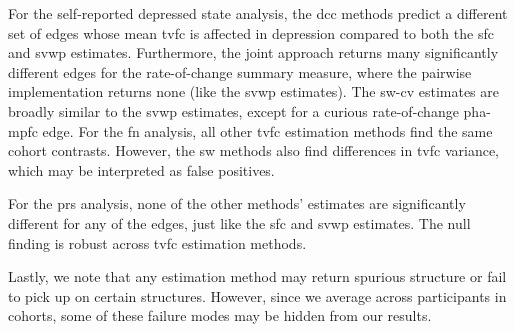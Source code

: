 For the self-reported depressed state analysis, the \gls{dcc} methods predict a different set of edges whose mean \gls{tvfc} is affected in depression compared to both the \gls{sfc} and \gls{svwp} estimates.
Furthermore, the joint approach returns many significantly different edges for the rate-of-change summary measure, where the pairwise implementation returns none (like the \gls{svwp} estimates).
The \gls{sw-cv} estimates are broadly similar to the \gls{svwp} estimates, except for a curious rate-of-change \gls{pha}-\gls{mpfc} edge.
%
For the \gls{fn} analysis, all other \gls{tvfc} estimation methods find the same cohort contrasts.
However, the \gls{sw} methods also find differences in \gls{tvfc} variance, which may be interpreted as false positives.

For the \gls{prs} analysis, none of the other methods' estimates are significantly different for any of the edges, just like the \gls{sfc} and \gls{svwp} estimates.
The null finding is robust across \gls{tvfc} estimation methods.

Lastly, we note that any estimation method may return spurious structure or fail to pick up on certain structures.
However, since we average across participants in cohorts, some of these failure modes may be hidden from our results.
